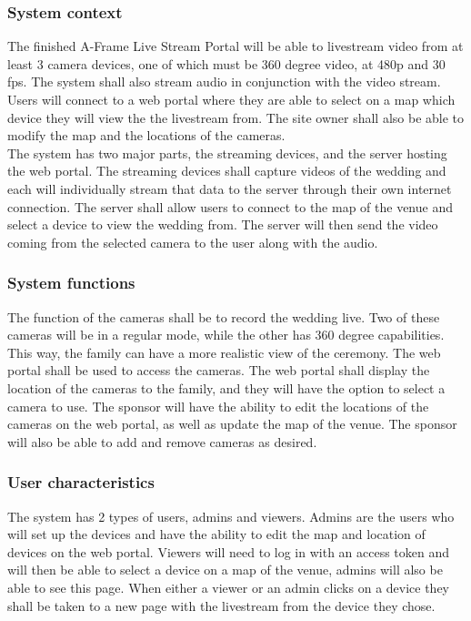 \documentclass[onecolumn, draftclsnofoot,10pt, compsoc]{IEEEtran}
\begin{document}
        \subsubsection{System context}
        The finished A-Frame Live Stream Portal will be able to livestream video from at least 3 camera devices, one of which must be 360 degree video, at 480p and 30 fps. 
        The system shall also stream audio in conjunction with the video stream. 
        Users will connect to a web portal where they are able to select on a map which device they will view the the livestream from. 
        The site owner shall also be able to modify the map and the locations of the cameras.
    \\
        The system has two major parts, the streaming devices, and the server hosting the web portal. 
        The streaming devices shall capture videos of the wedding and each will individually stream that data to the server through their own internet connection. 
        The server shall allow users to connect to the map of the venue and select a device to view the wedding from. 
        The server will then send the video coming from the selected camera to the user along with the audio.
        
        \subsubsection{System functions}
        The function of the cameras shall be to record the wedding live. 
        Two of these cameras will be in a regular mode, while the other has 360 degree capabilities. 
        This way, the family can have a more realistic view of the ceremony.
        The web portal shall be used to access the cameras. 
        The web portal shall display the location of the cameras to the family, and they will have the option to select a camera to use. 
        The sponsor will have the ability to edit the locations of the cameras on the web portal, as well as update the map of the venue. The sponsor will also be able to add and remove cameras as desired.
        
        \subsubsection{User characteristics}
        The system has 2 types of users, admins and viewers. 
        Admins are the users who will set up the devices and have the ability to edit the map and location of devices on the web portal.
        Viewers will need to log in with an access token and will then be able to select a device on a map of the venue, admins will also be able to see this page. 
        When either a viewer or an admin clicks on a device they shall be taken to a new page with the livestream from the device they chose.
        
\end{document}
